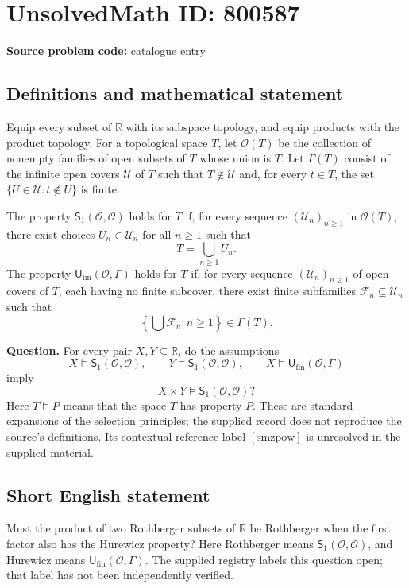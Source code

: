 \documentclass[11pt]{article}
\newcommand{\R}{\mathbb{R}}
\begin{document}
\section*{UnsolvedMath ID: 800587}
\textbf{Source problem code:} catalogue entry
\subsection{Definitions and mathematical statement}
Equip every subset of \(\R\) with its subspace topology, and equip products with the product topology. For a topological space \(T\), let \(\mathcal O(T)\) be the collection of nonempty families of open subsets of \(T\) whose union is \(T\). Let \(\Gamma(T)\) consist of the infinite open covers \(\mathcal U\) of \(T\) such that \(T\notin\mathcal U\) and, for every \(t\in T\), the set \(\{U\in\mathcal U:t\notin U\}\) is finite.

The property \(\mathsf S_1(\mathcal O,\mathcal O)\) holds for \(T\) if, for every sequence \((\mathcal U_n)_{n\geq1}\) in \(\mathcal O(T)\), there exist choices \(U_n\in\mathcal U_n\) for all \(n\geq1\) such that
\[
T=\bigcup_{n\geq1}U_n.
\]
The property \(\mathsf U_{\mathrm{fin}}(\mathcal O,\Gamma)\) holds for \(T\) if, for every sequence \((\mathcal U_n)_{n\geq1}\) of open covers of \(T\), each having no finite subcover, there exist finite subfamilies \(\mathcal F_n\subseteq\mathcal U_n\) such that
\[
\left\{\bigcup\mathcal F_n:n\geq1\right\}\in\Gamma(T).
\]

\textbf{Question.} For every pair \(X,Y\subseteq\R\), do the assumptions
\[
X\models\mathsf S_1(\mathcal O,\mathcal O),\qquad
Y\models\mathsf S_1(\mathcal O,\mathcal O),\qquad
X\models\mathsf U_{\mathrm{fin}}(\mathcal O,\Gamma)
\]
imply
\[
X\times Y\models\mathsf S_1(\mathcal O,\mathcal O)?
\]
Here \(T\models P\) means that the space \(T\) has property \(P\). These are standard expansions of the selection principles; the supplied record does not reproduce the source's definitions. Its contextual reference label \([\mathrm{smzpow}]\) is unresolved in the supplied material.
\subsection{Short English statement}
Must the product of two Rothberger subsets of \(\R\) be Rothberger when the first factor also has the Hurewicz property? Here Rothberger means \(\mathsf S_1(\mathcal O,\mathcal O)\), and Hurewicz means \(\mathsf U_{\mathrm{fin}}(\mathcal O,\Gamma)\). The supplied registry labels this question open; that label has not been independently verified.
\end{document}
